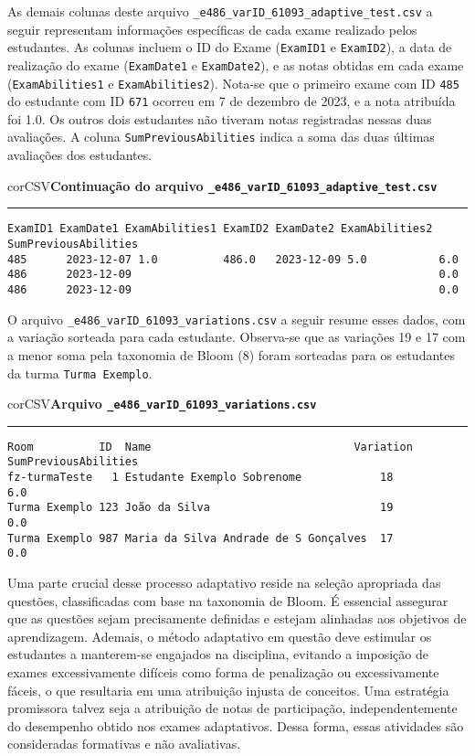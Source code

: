 As demais colunas deste arquivo \verb|_e486_varID_61093_adaptive_test.csv| a seguir representam informações específicas de cada exame realizado pelos estudantes. As colunas incluem o ID do Exame (\verb|ExamID1| e \verb|ExamID2|), a data de realização do exame (\verb|ExamDate1| e \verb|ExamDate2|), e as notas obtidas em cada exame (\verb|ExamAbilities1| e \verb|ExamAbilities2|). Nota-se que o primeiro exame com ID \verb|485| do estudante com ID \verb|671| ocorreu em 7 de dezembro de 2023, e a nota atribuída foi 1.0. Os outros dois estudantes não tiveram notas registradas nessas duas avaliações. A coluna \verb|SumPreviousAbilities| indica a soma das duas últimas avaliações dos estudantes.

\begin{myboxCode}{corCSV}{\textbf{Continuação do arquivo \texttt{\_e486\_varID\_61093\_adaptive\_test.csv}}}\vspace{3mm}
  \hrule
  \begin{verbatim}
ExamID1 ExamDate1 ExamAbilities1 ExamID2 ExamDate2 ExamAbilities2 SumPreviousAbilities
485      2023-12-07 1.0          486.0   2023-12-09 5.0           6.0 
486      2023-12-09                                               0.0 
486      2023-12-09                                               0.0
\end{verbatim}
\end{myboxCode}

O arquivo \verb|_e486_varID_61093_variations.csv| a seguir resume esses dados, com a variação sorteada para cada estudante. Observa-se que as variações 19 e 17 com a menor soma pela taxonomia de Bloom (8) foram sorteadas para os estudantes da turma \verb|Turma Exemplo|.

\begin{myboxCode}{corCSV}{\textbf{Arquivo \texttt{\_e486\_varID\_61093\_variations.csv}}}\vspace{3mm}
\hrule
\begin{verbatim}
Room          ID  Name                               Variation  SumPreviousAbilities
fz-turmaTeste   1 Estudante Exemplo Sobrenome            18         6.0
Turma Exemplo 123 João da Silva                          19         0.0
Turma Exemplo 987 Maria da Silva Andrade de S Gonçalves  17         0.0
\end{verbatim}
\end{myboxCode}


Uma parte crucial desse processo adaptativo reside na seleção apropriada das questões, classificadas com base na taxonomia de Bloom. É essencial assegurar que as questões sejam precisamente definidas e estejam alinhadas aos objetivos de aprendizagem. Ademais, o método adaptativo em questão deve estimular os estudantes a manterem-se engajados na disciplina, evitando a imposição de exames excessivamente difíceis como forma de penalização ou excessivamente fáceis, o que resultaria em uma atribuição injusta de conceitos. Uma estratégia promissora talvez seja a atribuição de notas de participação, independentemente do desempenho obtido nos exames adaptativos. Dessa forma, essas atividades são consideradas formativas e não avaliativas.

